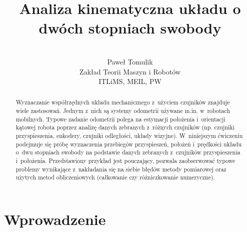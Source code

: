 \documentclass[paper=a4,DIV=12]{lpas}
\begin{document}
\subject{Laboratorium pomiarów, automatyki i~sterowania~I}


\title{Analiza kinematyczna układu o dwóch stopniach swobody}

\author{\\Paweł Tomulik\\ Zakład Teorii Maszyn i Robotów\\ ITLiMS, MEIL, PW}
\date{}
\maketitle

\pagebreak
\tableofcontents
\pagebreak

\begin{abstract}
\noindent Wyznaczanie współrzędnych układu mechanicznego z~użyciem czujników znajduje
  wiele zastosowań. Jednym z~nich są systemy odometrii używane m.in. w~robotach
  mobilnych. Typowe zadanie odometrii polega na estymacji położenia
  i~orientacji kątowej robota poprzez analizę danych zebranych z~różnych
  czujników (np. czujniki przyspieszenia, enkodery, czujniki odległości, układy
  wizyjne). W~niniejszym ćwiczeniu podejmuje się próbę wyznaczenia przebiegów
  przyspieszeń, położeń i~prędkości układu o~dwu stopniach swobody na podstawie
  danych zebranych z~czujników przyspieszenia i~położenia. Przedstawiony
  przykład jest pouczający, pozwala zaobserwować typowe problemy wynikające
  z~nakładania się na siebie błędów metody pomiarowej oraz użytych metod
  obliczeniowych (całkowanie czy różniczkowanie numeryczne).
\end{abstract}

\section{Wprowadzenie}
\label{sec:BP9CM}
\end{document}
